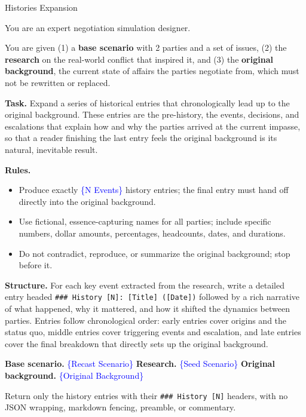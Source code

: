 \begin{table}[p]
\centering
\begin{promptbox}{Histories Expansion}
\begin{userbox}
\scriptsize
You are an expert negotiation simulation designer.

\smallskip
You are given (1) a \textbf{base scenario} with 2 parties and a set of issues, (2) the \textbf{research} on the real-world conflict that inspired it, and (3) the \textbf{original background}, the current state of affairs the parties negotiate from, which must not be rewritten or replaced.

\smallskip
\textbf{Task.} Expand a series of historical entries that chronologically lead up to the original background. These entries are the pre-history, the events, decisions, and escalations that explain how and why the parties arrived at the current impasse, so that a reader finishing the last entry feels the original background is its natural, inevitable result.

\smallskip
\textbf{Rules.}
\begin{itemize}[leftmargin=*, noitemsep, topsep=2pt]
\item Produce exactly \textcolor{blue}{\{N Events\}} history entries; the final entry must hand off directly into the original background.
\item Use fictional, essence-capturing names for all parties; include specific numbers, dollar amounts, percentages, headcounts, dates, and durations.
\item Do not contradict, reproduce, or summarize the original background; stop before it.
\end{itemize}

\smallskip
\textbf{Structure.} For each key event extracted from the research, write a detailed entry headed \texttt{\#\#\# History [N]: [Title] ([Date])} followed by a rich narrative of what happened, why it mattered, and how it shifted the dynamics between parties. Entries follow chronological order: early entries cover origins and the status quo, middle entries cover triggering events and escalation, and late entries cover the final breakdown that directly sets up the original background.

\smallskip
\textbf{Base scenario.} \textcolor{blue}{\{Recast Scenario\}} \quad \textbf{Research.} \textcolor{blue}{\{Seed Scenario\}} \quad \textbf{Original background.} \textcolor{blue}{\{Original Background\}}

\smallskip
Return only the history entries with their \texttt{\#\#\# History [N]} headers, with no JSON wrapping, markdown fencing, preamble, or commentary.
\end{userbox}
\end{promptbox}
\vspace{-0.25cm}
\caption{Prompt for history-axis expansion.}
\vspace{-0.3cm}
\label{tab:prompt-history-exp}
\end{table}
\clearpage


